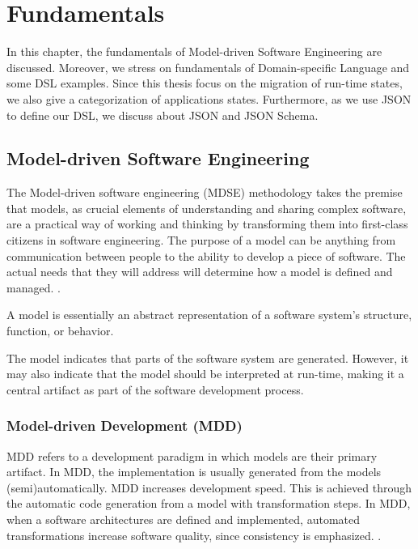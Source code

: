 \chapter{Fundamentals}
\label{ch:fundamentals}
In this chapter, the fundamentals of Model-driven Software Engineering are discussed. Moreover, we stress on fundamentals of Domain-specific Language and some DSL examples. Since this thesis focus on the migration of run-time states, we also give a categorization of applications states. Furthermore, as we use JSON to define our DSL, we discuss about JSON and JSON Schema.

\section{Model-driven Software Engineering}
The Model-driven software engineering (MDSE) methodology takes the premise that models, as crucial elements of understanding and sharing complex software, are a practical way of working and thinking by transforming them into first-class citizens in software engineering. The purpose of a model can be anything from communication between people to the ability to develop a piece of software. The actual needs that they will address will determine how a model is defined and managed. \cite{mdse}. 

\begin{definition}
A model is essentially an abstract representation of a software system’s structure, function, or behavior. 
\end{definition}

The model indicates that parts of the software system are generated. However, it may also indicate that the model should be interpreted at run-time, making it a central artifact as part of the software development process.

\subsection{Model-driven Development (MDD)}
MDD refers to a development paradigm in which models are their primary artifact. In MDD, the implementation is usually generated from the models (semi)automatically\cite{mdse}. MDD increases development speed. This is achieved through the automatic code generation from a model with transformation steps. In MDD, when a software architectures are defined and implemented, automated transformations increase software quality, since consistency is emphasized\cite{mdsd_en}.
.

